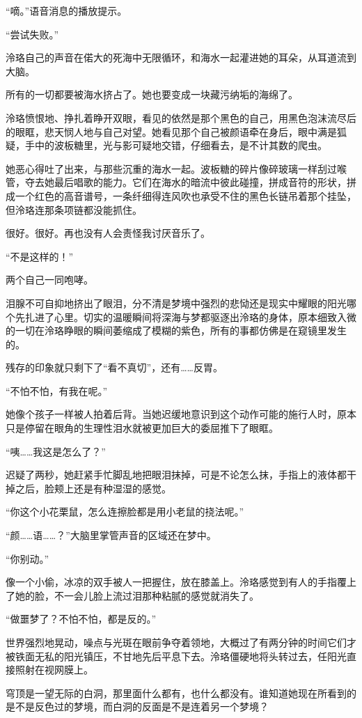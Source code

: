\documentclass[UTF8, scheme = chinese, openany]{ctexbook}
\begin{document}
“嘀。”语音消息的播放提示。

“尝试失败。”

泠珞自己的声音在偌大的死海中无限循环，和海水一起灌进她的耳朵，从耳道流到大脑。

所有的一切都要被海水挤占了。她也要变成一块藏污纳垢的海绵了。

泠珞愤恨地、挣扎着睁开双眼，看见的依然是那个黑色的自己，用黑色泡沫流尽后的眼眶，悲天悯人地与自己对望。她看见那个自己被颜语牵在身后，眼中满是狐疑，手中的波板糖里，光与影可疑地交错，仔细看去，是不计其数的爬虫。

她恶心得吐了出来，与那些沉重的海水一起。波板糖的碎片像碎玻璃一样刮过喉管，夺去她最后唱歌的能力。它们在海水的暗流中彼此碰撞，拼成音符的形状，拼成一个红色的高音谱号，一条纤细得连风吹也承受不住的黑色长链吊着那个挂坠，但泠珞连那条项链都没能抓住。

很好。很好。再也没有人会责怪我讨厌音乐了。

“不是这样的！”

两个自己一同咆哮。

泪腺不可自抑地挤出了眼泪，分不清是梦境中强烈的悲恸还是现实中耀眼的阳光哪个先扎进了心里。切实的温暖瞬间将深海与梦都驱逐出泠珞的身体，原本细致入微的一切在泠珞睁眼的瞬间萎缩成了模糊的紫色，所有的事都仿佛是在窥镜里发生的。

残存的印象就只剩下了“看不真切”，还有……反胃。

“不怕不怕，有我在呢。”

她像个孩子一样被人拍着后背。当她迟缓地意识到这个动作可能的施行人时，原本只是停留在眼角的生理性泪水就被更加巨大的委屈推下了眼眶。

“咦……我这是怎么了？”

迟疑了两秒，她赶紧手忙脚乱地把眼泪抹掉，可是不论怎么抹，手指上的液体都干掉之后，脸颊上还是有种湿湿的感觉。

“你这个小花栗鼠，怎么连擦脸都是用小老鼠的挠法呢。”

“颜……语……？”大脑里掌管声音的区域还在梦中。

“你别动。”

像一个小偷，冰凉的双手被人一把握住，放在膝盖上。泠珞感觉到有人的手指覆上了她的脸，不一会儿脸上流过泪那种粘腻的感觉就消失了。

“做噩梦了？不怕不怕，都是反的。”

世界强烈地晃动，噪点与光斑在眼前争夺着领地，大概过了有两分钟的时间它们才被铁面无私的阳光镇压，不甘地先后平息下去。泠珞僵硬地将头转过去，任阳光直接照射在视网膜上。

穹顶是一望无际的白洞，那里面什么都有，也什么都没有。谁知道她现在所看到的是不是反色过的梦境，而白洞的反面是不是连着另一个梦境？
\end{document}
